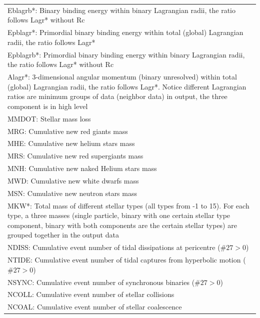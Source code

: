 \begin{longtable}{||p{0.42in}|p{0.25in}|p{0.6in}|p{0.6in}|p{0.4in}|p{2.3in}||}
\multicolumn{6}{|p{5.4in}|}{Eblagrb*: Binary binding energy within binary Lagrangian radii, the ratio follows Lagr* without Rc}\\
\multicolumn{6}{|p{5.4in}|}{Epblagr*: Primordial binary binding energy within total (global) Lagrangian radii, the ratio follows Lagr*}\\
\multicolumn{6}{|p{5.4in}|}{Epblagrb*: Primordial binary binding energy within binary Lagrangian radii, the ratio follows Lagr* without Rc}\\
\multicolumn{6}{|p{5.4in}|}{Alagr*: 3-dimensional angular momentum (binary unresolved) within total (global) Lagrangian radii, the ratio follows Lagr*. Notice different Lagrangian ratios are minimum groups of data (neighbor data) in output, the three component is in high level}\\
\multicolumn{6}{|p{5.4in}|}{MMDOT: Stellar mass loss }\\
\multicolumn{6}{|p{5.4in}|}{MRG:  Cumulative new red giants mass}\\
\multicolumn{6}{|p{5.4in}|}{MHE:  Cumulative new helium stars mass}\\
\multicolumn{6}{|p{5.4in}|}{MRS:  Cumulative new red supergiants mass}\\
\multicolumn{6}{|p{5.4in}|}{MNH:  Cumulative new naked Helium stars mass}\\
\multicolumn{6}{|p{5.4in}|}{MWD:  Cumulative new white dwarfs mass}\\
\multicolumn{6}{|p{5.4in}|}{MSN:  Cumulative new neutron stars mass}\\
\multicolumn{6}{|p{5.4in}|}{MKW*: Total mass of different stellar types (all types from -1 to 15). For each type, a three masses (single particle, binary with one certain stellar type component, binary with both components are the certain stellar types) are grouped together in the output data}\\
\multicolumn{6}{|p{5.4in}|}{NDISS: Cumulative event number of tidal dissipations at pericentre ($\#27>0$)}\\
\multicolumn{6}{|p{5.4in}|}{NTIDE: Cumulative event number of tidal captures from hyperbolic motion ($\#27>0$)}\\
\multicolumn{6}{|p{5.4in}|}{NSYNC: Cumulative event number of synchronous binaries ($\#27>0$)}\\
\multicolumn{6}{|p{5.4in}|}{NCOLL: Cumulative event number of stellar collisions}\\
\multicolumn{6}{|p{5.4in}|}{NCOAL: Cumulative event number of stellar coalescence}\\

\end{longtable}
